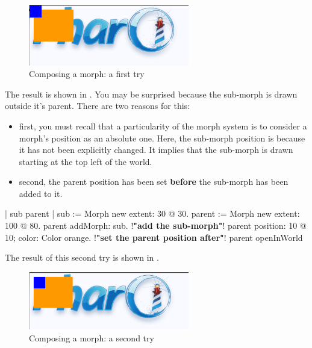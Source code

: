 \documentclass[a4paper,10pt,twoside]{book}
\begin{document}
\begin{figure}[htbp]
\begin{center}
	\includegraphics[width=7cm]{composingMorph1}
	\caption{Composing a morph: a first try}
\end{center}
\end{figure}

The result is shown in . You may be surprised because the sub-morph is drawn outside it's parent. There are two reasons for this:
\begin{itemize}
\item first, you must recall that a particularity of the morph system is to consider a morph's position as an absolute one. Here, the sub-morph position is  because it has not been explicitly changed. It implies that the sub-morph is drawn starting at the top left of the world.
\item second, the parent position has been set \textbf{before} the sub-morph has been added to it.
\end{itemize}


\begin{code}
| sub parent |
sub := Morph new extent: 30 @ 30. 
parent := Morph new extent: 100 @ 80. 
parent addMorph: sub. !\textbf{"add the sub-morph"}!
parent position: 10 @ 10; color: Color orange. !\textbf{"set the parent position after"}!
parent openInWorld 
\end{code}
The result of this second try is shown in .
\begin{figure}[htbp]
\begin{center}
	\includegraphics[width=7cm]{composingMorph2}
	\caption{Composing a morph: a second try}
\end{center}
\end{figure}
\end{document}
